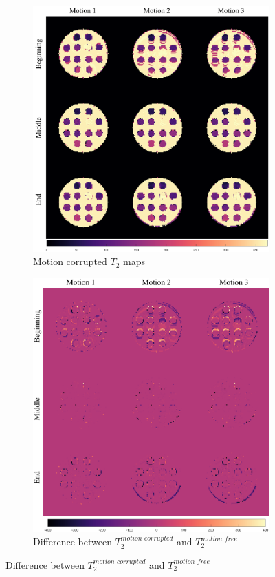 \begin{figure}[ht]
    \centering
    \begin{subfigure}[b]{.65\textwidth}
        \includegraphics[width=\textwidth]{images/mrf/T2mapsmotion}
        \caption{Motion corrupted $T_2$ maps}
    \end{subfigure}
    
    \begin{subfigure}[b]{.65\textwidth}
        \includegraphics[width=\textwidth]{images/mrf/T2SimuMinusT2Real}
        \caption{Difference between $T_2^{motion \, \, corrupted}$ and $T_2^{motion \, \, free}$}
    \end{subfigure}
    

\end{figure}
